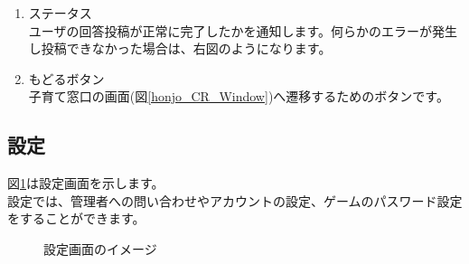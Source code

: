 \documentclass[a4j]{jarticle}
\begin{document}
\begin{enumerate}
  \renewcommand{\labelenumi}{\textcircled{\scriptsize \theenumi}}
  \item ステータス\\
        ユーザの回答投稿が正常に完了したかを通知します。何らかのエラーが発生し投稿できなかった場合は、右図のようになります。
  \item もどるボタン\\
        子育て窓口の画面(図\ref{honjo_CR_Window})へ遷移するためのボタンです。
\end{enumerate}

\newpage
\subsection{設定}
図\ref{configuration}は設定画面を示します。\\
設定では、管理者への問い合わせやアカウントの設定、ゲームのパスワード設定をすることができます。

\begin{figure}[H]
    \begin{center}
    \caption {設定画面のイメージ}
    \label{configuration}
    \end{center}
\end{figure}
\end{document}
